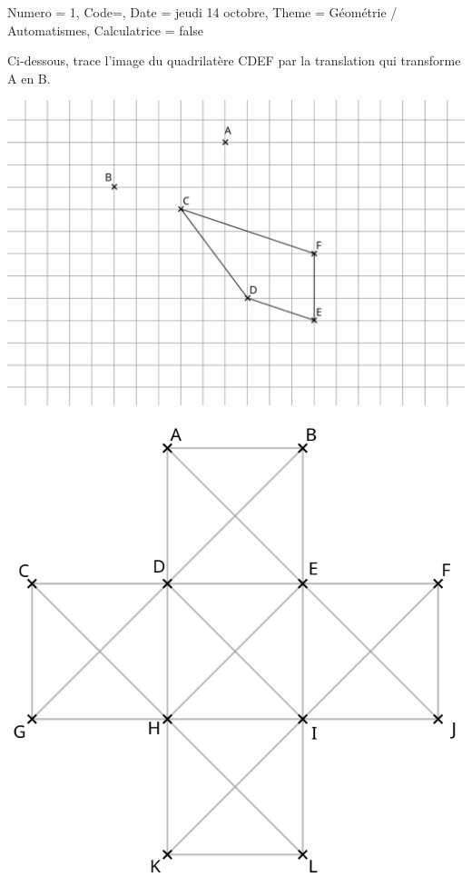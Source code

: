 \documentclass[11pt]{article}
\begin{document}
\begin{Maquette}[IE]{
        Numero = 1, Code={}, Date = jeudi 14 octobre, Theme = Géométrie / Automatismes, Calculatrice = false
    }

    \begin{exercice}
         Ci-dessous, trace l’image du quadrilatère CDEF par la translation qui transforme A en B.
        \begin{center}
            \includegraphics[width = .85 \linewidth]{Images/Évaluation 2 - Translation.png}
        \end{center}
    \end{exercice}

    \vspace{.5cm}
    \begin{exercice}
        \begin{multicols}{2}
            \begin{center}
                \includegraphics[width = \linewidth]{Images/Évaluation 2 - Croix.png}


\end{center}
\end{multicols}
\end{exercice}
\end{Maquette}
\end{document}
